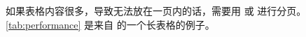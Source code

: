 如果表格内容很多，导致无法放在一页内的话，需要用  或  进行分页。
\autoref{tab:performance} 是来自 \nuaathesis{} 的一个长表格的例子。

\def\tabcaption{实验数据，这个题注十分的长，注意这在索引中的处理方式，还有 \cs{caption} 后面的双反斜杠}
\def\tabheadrow{
  \multirow{2}{*}{测试程序} & \multicolumn{1}{c}{正常运行} &
   \multicolumn{1}{c}{同步} & \multicolumn{1}{c}{检查点} &
   \multicolumn{1}{c}{卷回恢复} & \multicolumn{1}{c}{进程迁移} &
   \multicolumn{1}{c}{检查点} \\
   & \multicolumn{1}{c}{时间(s)} & \multicolumn{1}{c}{时间(s)} &
   \multicolumn{1}{c}{时间(s)} & \multicolumn{1}{c}{时间(s)} &
   \multicolumn{1}{c}{时间(s)} & \multicolumn{1}{c}{文件(KB)} \\
 }

\def\ctntabcap{
   \multicolumn{7}{c}{续表~\thetable\hskip1em 实验数据}  
 }
\def\ctntabcmd{
   \\\ctntabcap\\
   \toprule
   \tabheadrow
   \midrule
   \endhead
   \midrule
   \multicolumn{7}{r}{续下页}\\
   \endfoot
   \endlastfoot  
 } 
 
